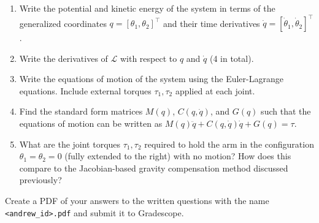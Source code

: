 \documentclass{16384_doc}
\begin{document}
\begin{questions}
    \begin{enumerate}[label=\alph*.]
        \item \text{[10 points]} Write the potential and kinetic energy of the system in terms of the generalized coordinates $q = [\theta_1, \theta_2]^\top$ and their time derivatives $\dot q = [\dot \theta_1, \dot \theta_2]^\top$.
        \begin{tcolorbox}[height=4cm]
        \end{tcolorbox}

        \pagebreak
        \item \text{[10 points]} Write the derivatives of $\mathcal L$ with respect to $q$ and $\dot q$ (4 in total).
        \begin{tcolorbox}[height=6cm]
        \end{tcolorbox}

        \item \text{[10 points]} Write the equations of motion of the system using the Euler-Lagrange equations. Include external torques $\tau_1, \tau_2$ applied at each joint.
        \begin{tcolorbox}[height=3cm]
        \end{tcolorbox}

        \item \text{[5 points]} Find the standard form matrices $M(q)$, $C(q, \dot q)$, and $G(q)$ such that the equations of motion can be written as $M(q)\ddot q + C(q, \dot q)\dot q + G(q) = \tau$.
        \begin{tcolorbox}[height=3cm]
        \end{tcolorbox}

        \item \text{[5 points]} What are the joint torques $\tau_1, \tau_2$ required to hold the arm in the configuration $\theta_1 = \theta_2 = 0$ (fully extended to the right) with no motion? How does this compare to the Jacobian-based gravity compensation method discussed previously?
        \begin{tcolorbox}[height=3cm]
        \end{tcolorbox}
    \end{enumerate}


\end{questions}

\begin{submissionChecklist}
        \item Create a PDF of your answers to the written questions with the name \verb!<andrew_id>.pdf! and submit it to Gradescope.
\end{submissionChecklist}
\end{document}
